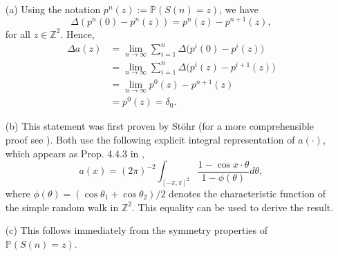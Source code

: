 \documentclass[11pt]{article}
\makeatletter
\renewenvironment{proof}[1][\proofname]{
   \par\pushQED{\qed}\normalfont
   \topsep6\p@\@plus6\p@\relax
   \trivlist\item[\hskip\labelsep\bfseries#1\@addpunct{.}]
   \ignorespaces
}{
   \popQED\endtrivlist\@endpefalse
}
\numberwithin{equation}{section}
\def\mydot{\boldsymbol{\cdot}}
\makeatother
\begin{document}
\begin{proof}
  \begin{itemize}
    \item[(a)] 
    Using the notation 
    $p^n(z) := \mathbb{P}(S(n) = z)$,
    we have
    \begin{equation}\nonumber
      \Delta ( p^n(0) - p^n(z) ) = p^n(z) - p^{n+1} (z),
    \end{equation} 
    for all $z \in \mathbb{Z}^2$.
    Hence, 
    \begin{equation}\nonumber
      \begin{split}
        \Delta a(z) &= 
          \lim_{n \rightarrow \infty} \sum_{i=1}^n 
          \Delta \big(p^i(0) - p^i(z) \big)\\
          & = \lim_{n \rightarrow \infty} \sum_{i=1}^n 
            \Delta \big(p^i(z) - p^{i+1}(z) \big)\\
          & = \lim_{n \rightarrow \infty} p^0(z) - p^{n+1}(z) \\
          & = p^0(z) = \delta_0.
      \end{split}
    \end{equation}

    \item[(b)] 
    This statement was first proven by Stöhr \cite{Stoer} 
    (for a more comprehensible proof see \cite{kozma}). 
    Both use the following explicit integral representation of $a(\mydot)$, 
    which appears as Prop. 4.4.3 in \cite{lawler}, 
    \begin{equation}\label{eq:rep_of_a}
      a(x) = (2\pi)^{-2} 
       \int_{[-\pi, \pi]^2}
       \frac{1-\cos x \cdot \theta}
       {1-\phi(\theta)} d \theta,
    \end{equation}
    where $\phi(\theta) = (\cos \theta_1 + \cos \theta_2)/2$ 
    denotes the characteristic function of the 
    simple random walk in $\mathbb{Z}^2$. 
    This equality can be used to derive the result.  

    \item[(c)] This follows immediately from the symmetry properties of 
    \hbox{$\mathbb{P}(S(n) = z)$.}
    

\end{itemize}
\end{proof}
\end{document}

